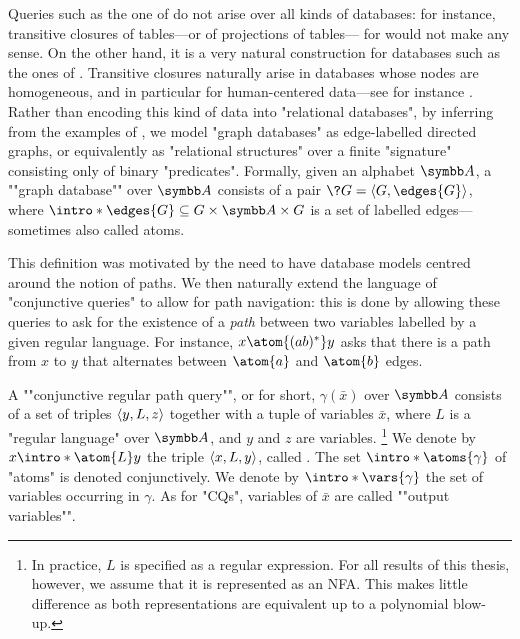 Queries such as the one of  do not arise
over all kinds of databases: for instance, 
transitive closures of tables---or of projections of tables---
for  would not make any sense.
On the other hand, it is a very natural construction
for databases such as the ones of .
Transitive closures naturally arise in databases whose nodes are homogeneous,
and in particular for human-centered data---see for instance \cite{Neo4jPanama}.
Rather than encoding this kind of data into "relational databases",
by inferring from the examples of ,
we model "graph databases" as edge-labelled directed graphs, or equivalently
as "relational structures" over a finite "signature" consisting only of
binary "predicates".
\AP Formally, given an alphabet $\A$, a ""graph database"" over $\A$
consists of a pair \AP$\?G = \tup{G, \edges{G}}$,
where $\intro*\edges{G} \subseteq G \times \A \times G$
is a set of labelled edges---sometimes also called atoms.

This definition was motivated by the need to have database models
centred around the notion of paths.
We then naturally extend the language of "conjunctive queries"
to allow for path navigation: this is done by allowing these queries
to ask for the existence of a \emph{path} between two variables
labelled by a given regular language. For instance,
$x \atom{ (ab)^*} y$ asks that there is a path from $x$
to $y$ that alternates between $\atom{a}$ and $\atom{b}$ edges.

\begin{definition}
    A \AP""conjunctive regular path query"", or  for short,
    $\gamma(\bar x)$ over $\A$ consists
    of a set of triples $\langle y,L,z\rangle$ together with a tuple of variables $\bar x$,
    where $L$ is a "regular language" over $\A$, and $y$ and $z$ are variables.%
    \footnote{In practice, $L$ is specified as a regular expression. For all results
    of this thesis, however, we assume that it is represented as an NFA. This makes
    little difference as both representations are equivalent up to a polynomial
    blow-up.}
    We denote by \AP$x \intro*\atom{L} y$ the triple $\langle x,L,y\rangle$,
    called . The set $\intro*\atoms{\gamma}$ of "atoms" is denoted conjunctively.
    We denote by $\intro*\vars{\gamma}$ the set of variables occurring in $\gamma$. As for
    "CQs", variables of $\bar x$ are called \AP""output variables"".
\end{definition}

